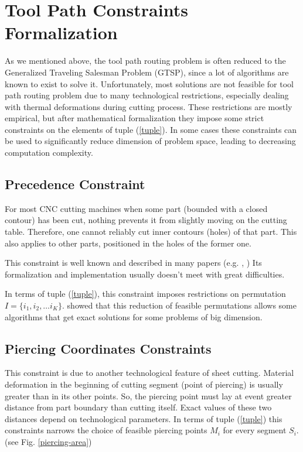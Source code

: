\documentclass{../download/tPRS2e}
\begin{document}
\section{Tool Path Constraints Formalization}

As we mentioned above,
the tool path routing problem is often reduced to the Generalized Traveling Salesman Problem (GTSP),
since a lot of algorithms are known to exist to solve it.
Unfortunately, most solutions are not feasible for tool path routing problem due to many technological restrictions,
especially dealing with thermal deformations during cutting process.
These restrictions are mostly empirical,
but after mathematical formalization they impose some strict constraints on the elements of tuple (\ref{tuple}).
In some cases these constraints can be used to significantly reduce dimension of problem space,
leading to decreasing computation complexity.

\subsection{Precedence Constraint}

For most CNC cutting machines when some part (bounded with a closed contour) has been cut,
nothing prevents it from slightly moving on the cutting table.
Therefore, one cannot reliably cut inner contours (holes) of that part.
This also applies to other parts, positioned in the holes of the former one.

This constraint is well known and described in many papers
(e.g. \cite{verkhoturov_mathematical_2008}, 
\cite{dewil_cutting_2011})
Its formalization and implementation usually doesn’t meet with great difficulties.

In terms of tuple (\ref{tuple}),
this constraint imposes restrictions on permutation 
$I = \{i_1, i_2, \dots i_K\}$.
\cite{petunin_2014}
showed that this reduction of feasible permutations allows some algorithms that get exact solutions for some problems of big dimension.

\subsection{Piercing Coordinates Constraints}

This constraint is due to another technological feature of sheet cutting.
Material deformation in the beginning of cutting segment (point of piercing) is usually greater than in its other points.
So, the piercing point must lay at event greater distance from part boundary than cutting itself.
Exact values of these two distances depend on technological parameters.
In terms of tuple (\ref{tuple}) this constraints narrows the choice of feasible piercing points $M_i$
for every segment $S_i$. (see Fig. \ref{piercing-area})
\end{document}
